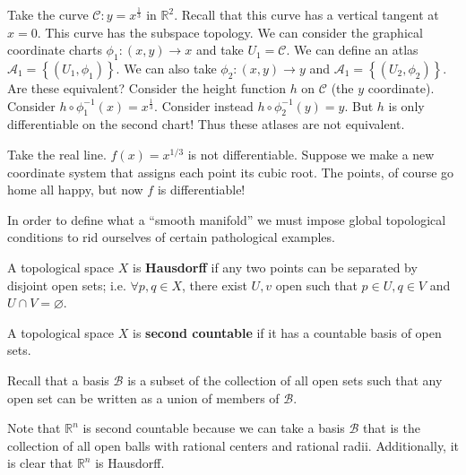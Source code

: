 \documentclass{mathnotes}
\begin{document}
\begin{exmp}
    Take the curve $\mathcal{C}:y=x^{\frac{1}{3}}$ in $\mathbb{R}^2$. Recall that this curve has a vertical tangent at $x=0$. This curve has the subspace topology.
    We can consider the graphical coordinate charts $\phi_1:(x,y)\to x$ and take $U_1=\mathcal{C}$. We can define an atlas $\mathcal{A}_1=\left\{ \left( U_1,\phi_1 \right) \right\}$.
    We can also take $\phi_2:(x,y)\to y$ and $\mathcal{A}_1=\left\{ (U_2,\phi_2) \right\}$. Are these equivalent? Consider the height function $h$ on $\mathcal{C}$ (the $y$
    coordinate). Consider $h\circ\phi_1^{-1}(x)=x^{\frac{1}{3}}$. Consider instead $h\circ\phi_2^{-1}(y)=y$. But $h$ is only differentiable on the second chart!
    Thus these atlases are not equivalent.
\end{exmp}

\begin{exmp}
    Take the real line. $f(x)=x^{1/3}$ is not differentiable. Suppose we make a new coordinate system that assigns each point its cubic root. The points, of course go home
    all happy, but now $f$ is differentiable!
\end{exmp}

In order to define what a ``smooth manifold'' we must impose global topological conditions to rid ourselves of certain pathological examples.

\begin{defn}
    A topological space $X$ is \textbf{Hausdorff} if any two points can be separated by disjoint open sets; i.e. $\forall p,q\in X$, there exist $U,v$ open such that
    $p\in U, q\in V$ and $U\cap V=\varnothing$.
\end{defn}

\begin{defn}
    A topological space $X$ is \textbf{second countable} if it has a countable basis of open sets.
\end{defn}

Recall that a basis $\mathcal{B}$ is a subset of the collection of all open sets such that any open set can be written as a union of members of $\mathcal{B}$.

\begin{exmp}
    Note that $\mathbb{R}^n$ is second countable because we can take a basis $\mathcal{B}$ that is the collection of all open balls
    with rational centers and rational radii. Additionally, it is clear that $\mathbb{R}^n$ is Hausdorff.
\end{exmp}
\end{document}
